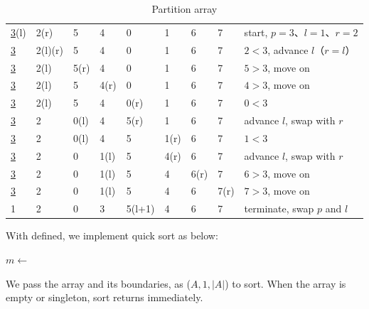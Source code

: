 \documentclass[b5paper]{article}
\begin{document}
\begin{table}[htbp]
\centering
\begin{tabular}{|llllllll|l|}
\hline
\underline{3}(l)  & 2(r) & 5 & 4 & 0 & 1 & 6 & 7 & start, $p = 3$、$l = 1$、$r = 2$ \\
\underline{3} & 2(l)(r) & 5 & 4 & 0 & 1 & 6 & 7 & $2 < 3$, advance $l$（$r=l$）\\
\underline{3} & 2(l) & 5(r) & 4 & 0 & 1 & 6 & 7 & $5 > 3$, move on \\
\underline{3} & 2(l) & 5 & 4(r) & 0 & 1 & 6 & 7 & $4 > 3$, move on \\
\underline{3} & 2(l) & 5 & 4 & 0(r) & 1 & 6 & 7 & $0 < 3$ \\
\underline{3} & 2 & 0(l) & 4 & 5(r) & 1 & 6 & 7 & advance $l$, swap with $r$ \\
\underline{3} & 2 & 0(l) & 4 & 5 & 1(r) & 6 & 7 & $1 < 3$ \\
\underline{3} & 2 & 0 & 1(l) & 5 & 4(r) & 6 & 7 & advance $l$, swap with $r$ \\
\underline{3} & 2 & 0 & 1(l) & 5 & 4 & 6(r) & 7 & $6 > 3$, move on \\
\underline{3} & 2 & 0 & 1(l) & 5 & 4 & 6 & 7(r) & $7 > 3$, move on \\
1 & 2 & 0 & 3 & 5(l+1) & 4 & 6 & 7 & terminate, swap $p$ and $l$ \\
\hline
\end{tabular}
\caption{Partition array} \label{tab:partition-steps}
\end{table}

With  defined, we implement quick sort as below:

\begin{algorithmic}[1]
    \State $m \gets$ 
    \State {}
    \State {}
  \EndIf
\EndProcedure
\end{algorithmic}

We pass the array and its boundaries, as ($A, 1, |A|$) to sort. When the array is empty or singleton, sort returns immediately.

\begin{Exercise}\label{ex:basic-qsort}
\end{Exercise}

\begin{Answer}[ref = {ex:basic-qsort}]
\end{Answer}
\end{document}
